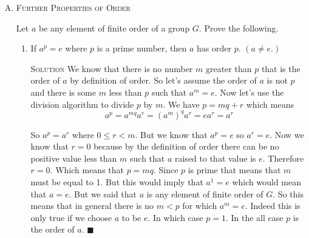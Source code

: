 \documentclass[twoside]{amsart}
\newcommand{\solution}{\textsc{Solution}\xspace}
\newcommand{\blank}{\vspace{5pt}}
\renewcommand{\qed}{\blacksquare}
\newcommand{\itm}{\blank\item}
\newcommand{\sol}{\blank\noindent\solution}
\newcommand{\ord}{\mathop{\mathrm{ord}}}
\begin{document}
\begin{enumerate}[A.]
\begin{enumerate}[1]
      Now I can use the same trick as the last two problems to prove
      that there is no nuber $m$ smaller than  $n$  such that $(ba)^m = e$.
      Let's assume that $m < n$ and $(ba)^m = e$. Then I have
      \[
         \underbrace{(ba)(ba) \cdots (ba)}_{m\text{ times}}b = 
         b\underbrace{(ab)(ab) \cdots (ab)}_{m\text{ times}} = be
      \]
      and using cancellation laws we have $(ab)^m = e$ which can't be
      becaues the order of $ab$ is $n$. Therefore the order
      of $ba$ equals the order of $ab$. $\qed$

      \itm $\ord(abc) = \ord(cab) = \ord(bca)$.

      \sol Assume the order of $abc$ is $n$. Then $(abc)^n = e$.
      Let's examine $(cab)^nc$. And use the same expansion trick
      from last time.

      \[
         (cab)^nc = c(abc)^n = c
      \]

      Using cancellation we get $(cab)^n = e$. We can use the same trick
      as last time to prove that $n$ is the smallest number for which
      this is true.  And we can use the same trick for $bca$. $\qed$

      \itm Let $x=a_1 a_2 \ldots a_n$, and let $y$ be a product of the same
      factors, permutated cyclically. (That is, $y = a_k a_{k+1} \ldots
      a_n a_1 \ldots a_{k-1}$.) Then $\ord(x) = \ord(y)$.

      \sol Use the exact same tricks from the last two problems. $\qed$

   \end{enumerate}

   \itm \textsc{Further Properties of Order}
   
   \noindent Let $a$ be any element of finite order of a group $G$. Prove
   the following.

   \begin{enumerate}[1]
      \itm If $a^p = e$ where $p$ is a prime number, then $a$ has order
      $p$. $(a \ne e.)$

      \sol We know that there is no number $m$ greater than $p$ that is
      the order of $a$ by definition of order. So let's assume the order of
      $a$ is not $p$ and there is some $m$ less than $p$ such that
      $a^m = e$. Now let's use the division algorithm to divide $p$
      by $m$. We have $p = mq + r$ which means
      \[
         a^p = a^{mq} a^r = (a^m)^q a^r = e a^r = a^r
      \]

      So $a^p = a^r$ where $0 \leq r < m$. But we know that $a^p = e$ so
      $a^r = e$. Now we know that $r = 0$ because by the definition of order
      there can be no positive value less than $m$ such that $a$ raised
      to that value is $e$. Therefore $r=0$. Which means that $p = mq$. 
      Since $p$ is prime that means that $m$ must be equal to 1. But this
      would imply that $a^1 = e$ which would mean that $a=e$. But we said
      that $a$ is any element of finite order of $G$. So this means that
      in general there is no $m < p$ for which $a^m = e$. Indeed this is
      only true if we choose $a$ to be $e$. In which case $p = 1$. In the
      all case $p$ is the order of $a$. $\qed$


\end{enumerate}
\end{enumerate}
\end{document}
